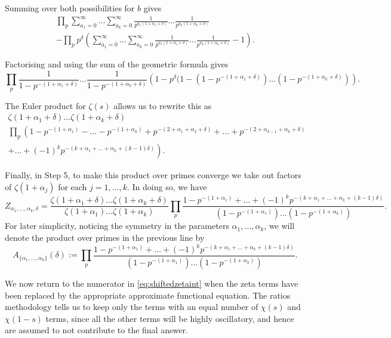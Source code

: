 \documentclass[12pt,a4paper,reqno]{amsart}
\theoremstyle{remark}
\numberwithin{equation}{section}
\begin{document}
Summing over both possibilities for $b$ gives
\begin{multline*}
    \prod_p \sum_{a_1=0}^{\infty}\dots\sum_{a_k=0}^{\infty} \frac{1}{p^{a_1(1+\alpha_1+\delta)}} \dots \frac{1}{p^{a_k(1+\alpha_k+\delta)}} \\
    - \prod_p p^\delta \left( \sum_{a_1=0}^{\infty}\dots\sum_{a_k=0}^{\infty} \frac{1}{p^{a_1(1+\alpha_1+\delta)}} \dots \frac{1}{p^{a_k(1+\alpha_k+\delta)}} -1 \right).
\end{multline*}

Factorising  and using the sum of the geometric formula gives
\begin{equation*}
    \prod_p \frac{1}{1 - p^{-(1+\alpha_1+\delta)}} \dots \frac{1}{1-p^{-(1+\alpha_k+\delta)}} \left(1 - p^\delta( 1-(1-p^{-(1+\alpha_1+\delta)})\dots(1-p^{-(1+\alpha_k+\delta)}) \right).
\end{equation*}

The Euler product for $\zeta (s)$ allows us to rewrite this as
\begin{multline*}
\zeta (1+\alpha_1 + \delta)  \dots \zeta (1+\alpha_k +\delta) \\
\prod_p  \left( 1-p^{-(1+\alpha_1)} - \dots -p^{-(1+\alpha_k)} + p^{-(2+\alpha_1 + \alpha_2 + \delta)} + \dots+ p^{-(2+\alpha_{k-1} + \alpha_k + \delta)} \right. \\
\left.+\dots + (-1)^k p^{-(k + \alpha_1 +\dots+ \alpha_k +(k-1)\delta)} \right).
\end{multline*}

Finally, in Step 5, to make this product over primes converge we take out factors of $\zeta(1+ \alpha_j)$ for each $j=1,\dots,k$. In doing so, we have
\begin{equation*}
Z_{\alpha_1,\dots,\alpha_k,\delta} = \frac{  \zeta (1+\alpha_1 + \delta)  \dots \zeta (1+\alpha_k +\delta)}{\zeta (1+\alpha_1)  \dots \zeta (1+\alpha_k)}  \prod_p \frac{1 - p^{-(1+\alpha_1)} +\dots+ (-1)^k p^{-(k + \alpha_1 +\dots+ \alpha_k +(k-1)\delta)}}{(1-p^{-(1+\alpha_1)})\dots(1-p^{-(1+\alpha_k)})}.
\end{equation*}
For later simplicity, noticing the symmetry in the parameters $\alpha_1,\dots,\alpha_k$, we will denote the product over primes in the previous line by
\[
A_{\{\alpha_1,\dots,\alpha_k\}}(\delta) :=  \prod_p \frac{1 - p^{-(1+\alpha_1)} +\dots+ (-1)^k p^{-(k + \alpha_1 +\dots+ \alpha_k +(k-1)\delta)}}{(1-p^{-(1+\alpha_1)})\dots(1-p^{-(1+\alpha_k)})} .
\]

We now return to the numerator in \eqref{eq:shiftedzetaint} when the zeta terms have been replaced by the appropriate approximate functional equation.  The ratios methodology tells us to keep only the terms with an equal number of $\chi (s)$ and $\chi (1-s)$ terms, since all the other terms will be  highly oscillatory, and hence are assumed to not contribute to the final answer.
\end{document}
